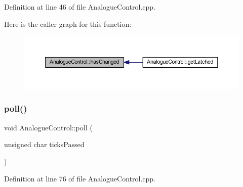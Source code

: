 Definition at line 46 of file Analogue\+Control.\+cpp.

Here is the caller graph for this function\+:
\nopagebreak
\begin{figure}[H]
\begin{center}
\leavevmode
\includegraphics[width=350pt]{dc/daa/class_analogue_control_ab670265f948d7416bcf07c91dcf97bce_icgraph}
\end{center}
\end{figure}
\mbox{\label{class_analogue_control_a5ec0b55a6abd8c73e61f86f2322251a5}} 
\subsubsection{\texorpdfstring{poll()}{poll()}}
{\footnotesize\ttfamily void Analogue\+Control\+::poll (\begin{DoxyParamCaption}\item[{unsigned char}]{ticks\+Passed }\end{DoxyParamCaption})}



Definition at line 76 of file Analogue\+Control.\+cpp.

